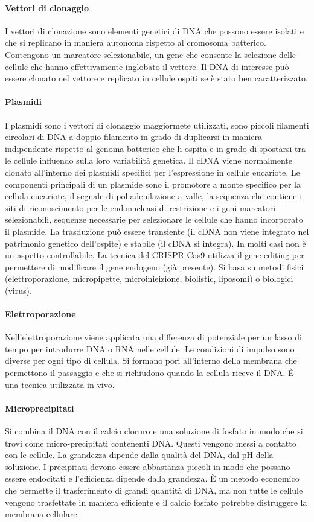 \paragraph{Vettori di clonaggio}
I vettori di clonazione sono elementi genetici di DNA che possono essere isolati e che si replicano in maniera autonoma rispetto al cromosoma batterico. Contengono un marcatore 
selezionabile, un gene che consente la selezione delle cellule che hanno effettivamente inglobato il vettore. Il DNA di interesse pu\`o essere clonato nel vettore e replicato in cellule
ospiti se \`e stato ben caratterizzato. 
\paragraph{Plasmidi}
I plasmidi sono i vettori di clonaggio maggiormete utilizzati, sono piccoli filamenti circolari di DNA a doppio filamento in grado di duplicarsi in maniera indipendente rispetto al 
genoma batterico che li ospita e in grado di spostarsi tra le cellule influendo sulla loro variabilit\`a genetica. Il cDNA viene normalmente clonato all'interno dei plasmidi specifici 
per l'espressione in cellule eucariote. Le componenti principali di un plasmide sono il promotore a monte specifico per la cellula eucariote, il segnale di poliadenilazione a valle, la
sequenza che contiene i siti di riconoscimento per le endonucleasi di restrizione e i geni marcatori selezionabili, sequenze necessarie per selezionare le cellule che hanno incorporato 
il plasmide. La trasduzione pu\`o essere transiente (il cDNA non viene integrato nel patrimonio genetico dell'ospite) e stabile (il cDNA si integra). In molti casi non \`e un aspetto
controllabile. La tecnica del CRISPR Cas9 utilizza il gene editing per permettere di modificare il gene endogeno (gi\`a presente). Si basa su metodi fisici (elettroporazione,
micropipette, microinieizione, biolistic, liposomi) o biologici (virus). 
\paragraph{Elettroporazione}
Nell'elettroporazione viene applicata una differenza di potenziale per un lasso di tempo per introdurre DNA o RNA nelle cellule. Le condizioni di impulso sono diverse per ogni tipo di 
cellula. Si formano pori all'interno della membrana che permettono il passaggio e che si richiudono quando la cellula riceve il DNA. \`E una tecnica utilizzata in vivo.
\paragraph{Microprecipitati}
Si combina il DNA con il calcio cloruro e una soluzione di fosfato in modo che si trovi come micro-precipitati contenenti DNA. Questi vengono messi a contatto con le cellule. La 
grandezza dipende dalla qualit\`a del DNA, dal pH della soluzione. I precipitati devono essere abbastanza piccoli in modo che possano essere endocitati e l'efficienza dipende dalla 
grandezza. \`E un metodo economico che permette il trasferimento di grandi quantit\`a di DNA, ma non tutte le cellule vengono trasfettate in maniera efficiente e il calcio fosfato 
potrebbe distruggere la membrana cellulare. 
